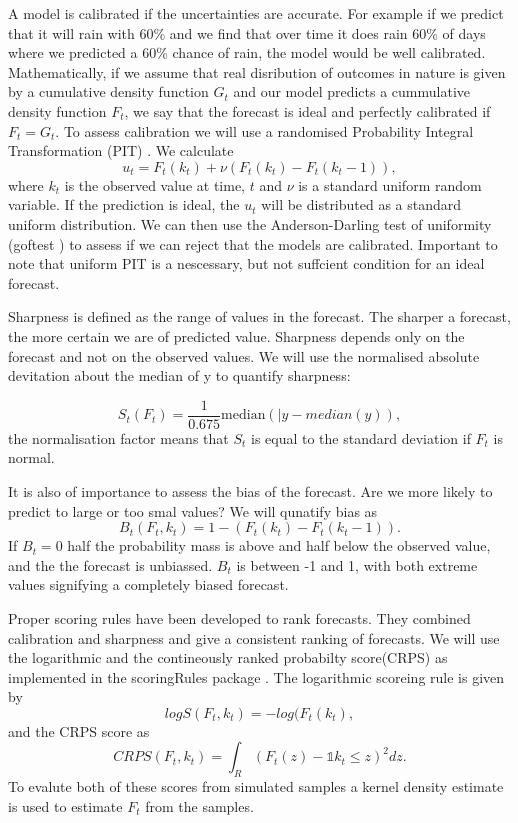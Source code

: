 \documentclass[12pt]{article}
\begin{document}
A model is calibrated if the uncertainties are accurate. For example if we predict that it will rain with 60\% and we find that over time it does rain 60\% of days where we predicted a 60\% chance of rain, the model would be well calibrated. Mathematically, if we assume that real disribution of outcomes in nature is given by a cumulative density function $G_t$ and our model predicts a cummulative density function $F_t$, we say that the forecast is ideal and perfectly calibrated if $F_t=G_t$. To assess calibration we will use a randomised Probability Integral Transformation (PIT) \cite{czadoPredictiveModelAssessment2009a}. We calculate
\[ u_t = F_t(k_t) + \nu (F_t(k_t) - F_t(k_t -1)),\]
where $k_t$ is the observed value at time, $t$ and $\nu$ is a standard uniform random variable. If the prediction is ideal, the $u_t$ will be distributed as a standard uniform distribution. We can then use the Anderson-Darling test of uniformity (goftest \cite{farawayGoftestClassicalGoodnessofFit2017}) to assess if we can reject that the models are calibrated. Important to note that uniform PIT is a nescessary, but not suffcient condition for an ideal forecast.

Sharpness is defined as the range of values in the forecast. The sharper a forecast, the more certain we are of predicted value. Sharpness depends only on the forecast and not on the observed values. We will use the normalised absolute devitation about the median of y to quantify sharpness:

\[ S_t(F_t) = \frac{1}{0.675} \text{median}(|y - median(y)),\]
the normalisation factor means that $S_t$ is equal to the standard deviation if $F_t$ is normal.

It is also of importance to assess the bias of the forecast. Are we more likely to predict to large or too smal values? We will qunatify bias as
\[B_t(F_t, k_t) = 1 - (F_t(k_t) - F_t(k_t - 1)).\]
If $B_t=0$ half the probability mass is above and half below the observed value, and the the forecast is unbiassed. $B_t$ is between -1 and 1, with both extreme values signifying a completely biased forecast.

Proper scoring rules have been developed to rank forecasts. They combined calibration and sharpness and give a consistent ranking of forecasts. We will use the logarithmic and the contineously ranked probabilty score(CRPS) as implemented in the scoringRules package \cite{jordanEvaluatingProbabilisticForecasts2018}. The logarithmic scoreing rule is given by
\[logS(F_t, k_t) = -log(F_t(k_t),\]
and the CRPS score as
\[CRPS(F_t,k_t) = \int_R(F_t(z) - \mathds{1}{k_t \leq z})^2 dz.\]
To evalute both of these scores from simulated samples a kernel density estimate is used to estimate $F_t$ from the samples. 
\end{document}
